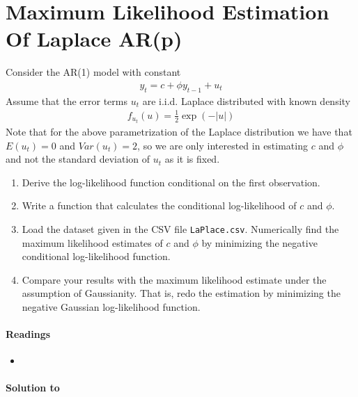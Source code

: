 \section[Maximum Likelihood Estimation Of Laplace AR(p)]{Maximum Likelihood Estimation Of Laplace AR(p)\label{ex:MaximumLikelihoodEstimationLaPlaceARp}}
Consider the AR(1) model with constant
\begin{align*}
y_t = c + \phi y_{t-1} + u_t
\end{align*}
Assume that the error terms \(u_t\) are i.i.d. Laplace distributed with known density
\begin{align*}
f_{u_{t}}(u)=\frac{1}{2}\exp \left( -|u|\right)
\end{align*}
Note that for the above parametrization of the Laplace distribution
  we have that \(E(u_t)=0\) and \(Var(u_t)=2\),
  so we are only interested in estimating \(c\) and \(\phi\)
  and not the standard deviation of \(u_t\) as it is fixed.
\begin{enumerate}
\item Derive the log-likelihood function conditional on the first observation.
\item Write a function that calculates the conditional log-likelihood of \(c\) and \(\phi\).
\item Load the dataset given in the CSV file \texttt{LaPlace.csv}.
Numerically find the maximum likelihood estimates of \(c\) and \(\phi\)
  by minimizing the negative conditional log-likelihood function.
\item Compare your results with the maximum likelihood estimate under the assumption of Gaussianity.
That is, redo the estimation by minimizing the negative Gaussian log-likelihood function.
\end{enumerate}

\paragraph{Readings}
\begin{itemize}
	\item \textcite{Lutkepohl_2004_UnivariateTimeSeries}
\end{itemize}


\begin{solution}\textbf{Solution to }
\ifDisplaySolutions

\fi
\newpage
\end{solution}